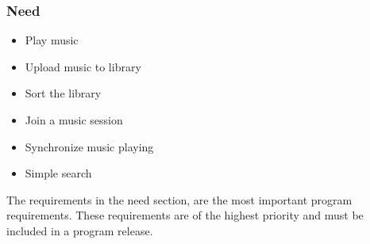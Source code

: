 \subsubsection{Need}


\begin{itemize}
	\item Play music
	\item Upload music to library
	\item Sort the library
	\item Join a music session
	\item Synchronize music playing
	\item Simple search
\end{itemize}


The requirements in the need section, are the most important program requirements. These
requirements are of the highest priority and must be included in a program release.